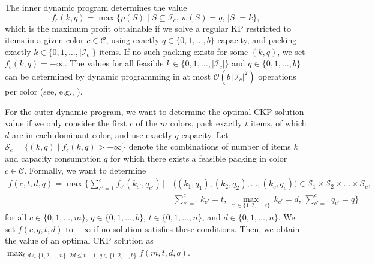\documentclass[preprint,11pt]{elsarticle}
\newcommand{\items}{\mathcal{I}}
\newcommand{\colors}{\mathcal{C}}
\newcommand{\profit}{p}
\newcommand{\weight}{w}
\newcommand{\capacity}{b}
\theoremstyle{definition}
\begin{document}
The inner dynamic program determines the value
\begin{equation}\label{dp2:innerdpggoal}
    f_c(k,q) = \max\{\profit(S) \mid S \subseteq \items_c, \, \weight(S) = q, \, |S| = k\}, 
\end{equation}
which is the maximum profit obtainable if we solve a regular KP restricted to items in a given color $c \in \colors$, using exactly $q \in \{0,1,\dots, \capacity\}$ capacity, and packing exactly $k \in \{0,1,\dots, |\items_c|\} $ items.
If no such packing exists for some $(k,q)$, we set $f_c(k,q) = - \infty$.
The values for all feasible $k \in \{0,1,\dots, |\items_c|\}$ and $q \in \{0,1,\dots,\capacity\}$ can be determined by dynamic programming in at most $\mathcal{O}(\capacity \, |\items_c|^2)$ operations per color (see, e.g., \cite{KPP04li}). %

For the outer dynamic program, we want to determine the optimal CKP solution value if we only consider the first \(c\) of the $m$ colors, pack exactly $t$ items, of which $d$ are in each dominant color, and use exactly $q$ capacity.
Let $\mathcal{S}_c = \{(k,q) \mid f_c(k,q) > -\infty\}$ denote the combinations of number of items $k$ and capacity consumption $q$ for which there exists a feasible packing in color $c \in \colors$.
Formally, we want to determine
\begin{equation}\label{dp2outergoal}
\begin{aligned}
    f(c,t,d,q) = \max \Bigg\{\sum_{c' = 1}^c f_{c'}(k_{c'}, q_{c'}) \, \big| \, & \bigg((k_1,q_1), (k_2,q_2), \dots, (k_c,q_c)\bigg) \in \mathcal{S}_1 \times \mathcal{S}_2 \times \dots \times \mathcal{S}_c,\\[-1ex]
    & \sum_{c' = 1}^c k_{c'} = t, \, \max_{c' \in \{1,2,\dots,c\}} \, k_{c'} = d, \, \sum_{c' = 1}^c q_{c'} = q \Bigg\}
\end{aligned}
\end{equation}
for all \(c \in \{0, 1, \dots,m\}\), \(q \in \{0, 1, \dots,\capacity\}\), \(t \in \{0, 1, \dots,n\}\), and \(d \in \{0, 1, \dots,n\}\). We set \(f(c,q,t,d)\) to \(-\infty\) if no solution satisfies these conditions.
Then, we obtain the value of an optimal CKP solution as $\max_{t, d \in \{1,2,\dots,n\}, \, 2d \leq t + 1, \, q \in \{1,2,\dots,\capacity\}} f(m,t,d,q)$.
\end{document}
